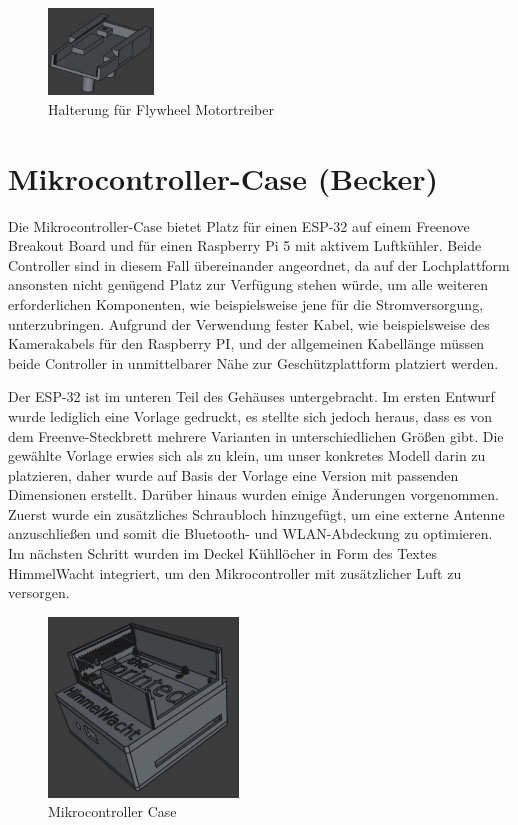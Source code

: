 \begin{figure}[ht]
    \centering
    \includegraphics[width=0.25\textwidth, keepaspectratio]{images/becker_cad_flywheel.png}
    \caption{Halterung für Flywheel Motortreiber}
\end{figure}

\section{Mikrocontroller-Case (Becker)}

Die Mikrocontroller-Case bietet Platz für einen ESP-32 auf einem Freenove Breakout Board und für einen Raspberry Pi 5 mit aktivem Luftkühler. 
Beide Controller sind in diesem Fall übereinander angeordnet, da auf der Lochplattform ansonsten nicht genügend Platz zur Verfügung stehen würde, um alle weiteren erforderlichen Komponenten, wie beispielsweise jene für die Stromversorgung, unterzubringen. 
Aufgrund der Verwendung fester Kabel, wie beispielsweise des Kamerakabels für den Raspberry PI, und der allgemeinen Kabellänge müssen beide Controller in unmittelbarer Nähe zur Geschützplattform platziert werden.

Der ESP-32 ist im unteren Teil des Gehäuses untergebracht. 
Im ersten Entwurf wurde lediglich eine Vorlage \cite{cad_esp_case_blueprint} gedruckt, es stellte sich jedoch heraus, dass es von dem Freenve-Steckbrett mehrere Varianten in unterschiedlichen Größen gibt. 
Die gewählte Vorlage erwies sich als zu klein, um unser konkretes Modell darin zu platzieren, daher wurde auf Basis der Vorlage eine Version mit passenden Dimensionen erstellt. 
Darüber hinaus wurden einige Änderungen vorgenommen. Zuerst wurde ein zusätzliches Schraubloch hinzugefügt, um eine externe Antenne anzuschließen und somit die Bluetooth- und WLAN-Abdeckung zu optimieren. 
Im nächsten Schritt wurden im Deckel Kühllöcher in Form des Textes HimmelWacht integriert, um den Mikrocontroller mit zusätzlicher Luft zu versorgen.

\begin{figure}[H]
    \centering
    \includegraphics[width=0.45\textwidth, keepaspectratio]{images/becker_cad_esp_case.png}
    \caption{Mikrocontroller Case}
\end{figure}


